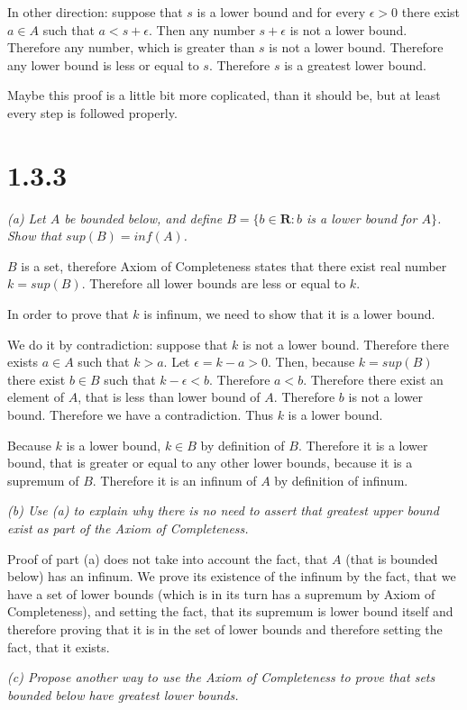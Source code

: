 \documentclass[11pt,oneside,titlepage]{article}
\begin{document}
In other direction: suppose that $s$ is a lower bound and for every $\epsilon
> 0$ there exist $a \in A$ such that $a < s + \epsilon$. Then any number
$s + \epsilon$ is not a lower bound. Therefore any number, which is greater
than $s$ is not a lower bound. Therefore any lower bound is less or equal to
$s$. Therefore $s$ is a greatest lower bound.

Maybe this proof is a little bit more coplicated, than it should be, but
at least every step is followed properly.

\section*{1.3.3}
\textit{(a) Let $A$ be bounded below, and define $B = \{b \in \textbf{R}:
  b $ is a lower bound for $A\}$. Show that $sup(B) = inf(A)$.}

$B$ is a set, therefore Axiom of Completeness states that there exist real
number $k = sup(B)$. Therefore all lower bounds are less or equal to $k$.

In order to prove that $k$ is infinum, we need to show that it is a lower
bound.

We do it by contradiction: suppose that $k$ is not a lower bound. Therefore
there exists $a \in A$ such that $k > a$. Let $\epsilon = k - a > 0$. Then,
because $k = sup(B)$ there exist $b \in B$ such that $k - \epsilon < b$.
Therefore $a < b$. Therefore there exist an element of $A$, that is less than
lower bound of $A$. Therefore $b$ is not a lower bound. Therefore we have a
contradiction. Thus $k$ is a lower bound.

Because $k$ is a lower bound, $k \in B$ by definition of $B$. Therefore it is
a lower bound, that is greater or equal to any other lower bounds, because it
is a supremum of $B$. Therefore it is an infinum of $A$ by definition of
infinum.

\textit{(b) Use (a) to explain why there is no need to assert that greatest
  upper bound exist as part of the Axiom of Completeness.}

Proof of part (a) does not take into account the fact, that $A$ (that is
bounded below) has an infinum. We prove its existence of the infinum by
the fact, that we have a set of lower bounds (which is in its turn
has a supremum by Axiom of Completeness), and setting the fact, that its
supremum is lower bound itself  and therefore proving that it is in the set of
lower bounds and therefore setting the fact, that it exists.

\textit{(c) Propose another way to use the Axiom of Completeness to prove
  that sets bounded below have greatest lower bounds.}
\end{document}

